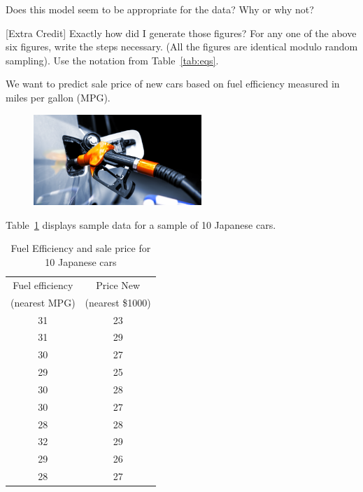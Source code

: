 \documentclass[12pt]{article}
\begin{document}
Does this model seem to be appropriate for the data? Why or why not?

 [Extra Credit] Exactly how did I generate those figures? For any one of the above six figures, write the steps necessary. (All the figures are identical modulo random sampling). Use the notation from Table~\ref{tab:eqs}.


\eenum


\problem We want to predict sale price of new cars based on fuel efficiency measured in miles per gallon (MPG). 

\begin{figure}[htp]
\centering
\includegraphics[width=2.5in]{fuel.png}
\end{figure}

Table~\ref{tab:mpgs} displays sample data for a sample of 10 Japanese cars.

\begin{table}[htp]
\centering
\begin{tabular}{c|c}
Fuel efficiency & Price New \\
(nearest MPG) & (nearest \$1000) \\ \hline
31 &23 \\
31 &29 \\
30 &27 \\
29 &25 \\
30 &28 \\
30 &27 \\
28 &28 \\
32 &29 \\
29 &26 \\
28 &27 \\
\end{tabular}
\caption{Fuel Efficiency and sale price for 10 Japanese cars}
\label{tab:mpgs}
\end{table}
\end{document}
